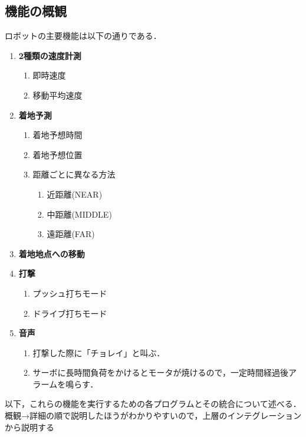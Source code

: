 \documentclass[10pt, oneside, titlepage]{ltjarticle}  %
\begin{document}
\subsection{機能の概観}
ロボットの主要機能は以下の通りである．
\begin{enumerate}
  \item {\bf 2種類の速度計測}
  \begin{enumerate}
    \item 即時速度
    \item 移動平均速度
  \end{enumerate}
  \item {\bf 着地予測}
  \begin{enumerate}
    \item 着地予想時間
    \item 着地予想位置
    \item 距離ごとに異なる方法
    \begin{enumerate}
      \item 近距離(NEAR)
      \item 中距離(MIDDLE)
      \item 遠距離(FAR)
    \end{enumerate}
  \end{enumerate}
  \item {\bf 着地地点への移動}
  \item {\bf 打撃}
  \begin{enumerate}
    \item プッシュ打ちモード
    \item ドライブ打ちモード
  \end{enumerate}
  \item {\bf 音声}
  \begin{enumerate}
    \item 打撃した際に「チョレイ」と叫ぶ．
    \item サーボに長時間負荷をかけるとモータが焼けるので，一定時間経過後アラームを鳴らす．
  \end{enumerate}
\end{enumerate}
以下，これらの機能を実行するための各プログラムとその統合について述べる．概観→詳細の順で説明したほうがわかりやすいので，上層のインテグレーションから説明する
\end{document}

